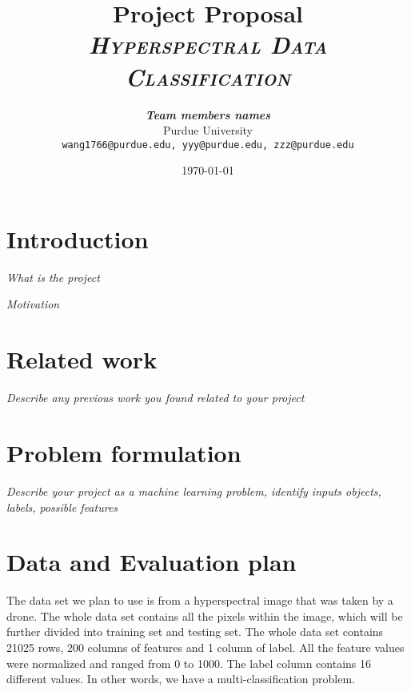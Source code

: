 \documentclass[11pt]{article}
\title{
\textbf{Project Proposal} \\ \textsc{\textit{Hyperspectral Data Classification}} \\
}
\author{
	\textbf{\textit{Team members names}} \\
	Purdue University\\
	\texttt{wang1766@purdue.edu, yyy@purdue.edu, zzz@purdue.edu}
}
\date{\today}
\begin{document}
\maketitle


\section{Introduction}
\textit{What is the project}

\textit{Motivation}

\section{Related work}
\textit{Describe any previous work you found related to your project}

\section{Problem formulation}
\textit{Describe your project as a machine learning problem, identify inputs objects, labels, possible features}

\section{Data and Evaluation plan}

The data set we plan to use is from a hyperspectral image that was taken by a drone. The whole data set contains all the pixels within the image, which will be further divided into training set and testing set. The whole data set contains 21025 rows, 200 columns of features and 1 column of label. All the feature values were normalized and ranged from 0 to 1000. The label column contains 16 different values. In other words, we have a multi-classification problem.
\end{document}
